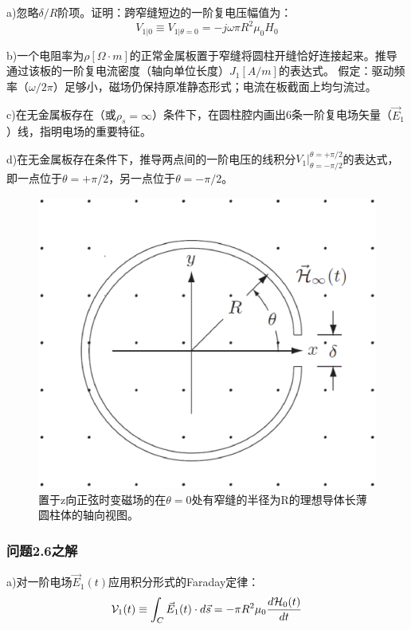 a)忽略$\delta/R$阶项。证明：跨窄缝短边的一阶复电压幅值为：
$$V_{1|0}\equiv V_{1|\theta=0}=-j\omega \pi R^2 \mu_0 H_0$$

b)一个电阻率为$\rho[\Omega\cdot m]$的正常金属板置于窄缝将圆柱开缝恰好连接起来。推导通过该板的一阶复电流密度（轴向单位长度）$J_1 [A/m]$的表达式。
假定：驱动频率（$\omega/2\pi$）足够小，磁场仍保持原准静态形式；电流在板截面上均匀流过。

c)在无金属板存在（或$\rho_s=\infty$）条件下，在圆柱腔内画出6条一阶复电场矢量（$\vec{E}_1$）线，指明电场的重要特征。

d)在无金属板存在条件下，推导两点间的一阶电压的线积分$V_1 |_{\theta=-\pi/2}^{\theta=+\pi/2}$的表达式，即一点位于$\theta=+\pi/2$，另一点位于$\theta=-\pi/2$。

\begin{figure}
  \centering
 \includegraphics[scale=0.4]{chpt2/figs/fig2.9.eps}
  \caption{置于z向正弦时变磁场的在$\theta=0$处有窄缝的半径为R的理想导体长薄圆柱体的轴向视图。}
\end{figure}

\subsubsection*{问题2.6之解}
a)对一阶电场$\vec{E}_1(t)$应用积分形式的Faraday定律：
\begin{equation*}
\CMcal{V}_1(t) \equiv \int_{C} \vec{E}_1 (t) \cdot d\vec{s}=-\pi R^2 \mu_0 \frac{d\CMcal{H}_0(t)}{dt}
\end{equation*}


